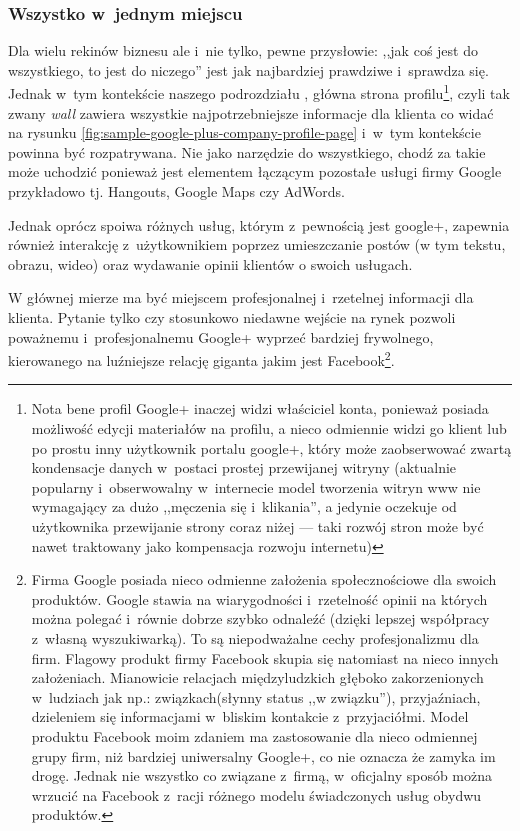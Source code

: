 \subsubsection{\nmu Wszystko w~jednym miejscu}
\label{subsubsec:wszystko-w-jednym-miejscu}
Dla wielu rekinów biznesu ale i~nie tylko, pewne przysłowie: ,,jak coś jest  do wszystkiego, to jest do niczego'' jest jak najbardziej prawdziwe i~sprawdza się. Jednak w~tym kontekście naszego podrozdziału , główna strona profilu\footnote{Nota bene profil Google+ inaczej widzi właściciel konta, ponieważ posiada możliwość edycji materiałów na profilu, a nieco odmiennie widzi go klient lub po prostu inny użytkownik portalu google+, który może zaobserwować zwartą kondensacje danych w~postaci prostej przewijanej witryny (aktualnie popularny i~obserwowalny w~internecie model tworzenia witryn www nie wymagający za dużo ,,męczenia się i~klikania'', a jedynie oczekuje od użytkownika przewijanie strony coraz niżej --- taki rozwój stron może być nawet traktowany jako kompensacja rozwoju internetu)}, czyli tak zwany \textit{wall} zawiera wszystkie najpotrzebniejsze informacje dla klienta co widać na rysunku \ref{fig:sample-google-plus-company-profile-page} i~w~tym kontekście powinna być rozpatrywana. Nie jako narzędzie do wszystkiego, chodź za takie może uchodzić ponieważ jest elementem łączącym pozostałe usługi firmy Google przykładowo tj. Hangouts, Google Maps czy AdWords. 

\noindent Jednak oprócz spoiwa różnych usług, którym z~pewnością jest google+, zapewnia również interakcję z~użytkownikiem poprzez umieszczanie postów (w tym tekstu, obrazu, wideo) oraz wydawanie opinii klientów o swoich usługach. 

W głównej mierze ma być miejscem profesjonalnej i~rzetelnej informacji dla klienta. Pytanie tylko czy stosunkowo niedawne wejście na rynek pozwoli poważnemu i~profesjonalnemu Google+ wyprzeć bardziej frywolnego, kierowanego na luźniejsze relację giganta jakim jest Facebook\footnote{Firma Google posiada nieco odmienne założenia społecznościowe dla swoich produktów. Google stawia na wiarygodności i~rzetelność opinii na których można polegać i~równie dobrze szybko odnaleźć (dzięki lepszej współpracy z~własną wyszukiwarką). To są niepodważalne cechy profesjonalizmu dla firm. 
Flagowy produkt firmy Facebook skupia się natomiast na nieco innych założeniach. Mianowicie relacjach międzyludzkich głęboko zakorzenionych w~ludziach jak np.: związkach(słynny status ,,w związku''), przyjaźniach, dzieleniem się informacjami w~bliskim kontakcie z~przyjaciółmi. Model produktu Facebook moim zdaniem ma zastosowanie dla nieco odmiennej grupy firm, niż bardziej uniwersalny Google+, co nie oznacza że zamyka im drogę. Jednak nie wszystko co związane z~firmą, w~oficjalny sposób można wrzucić na Facebook z~racji różnego modelu świadczonych usług obydwu produktów.}.


